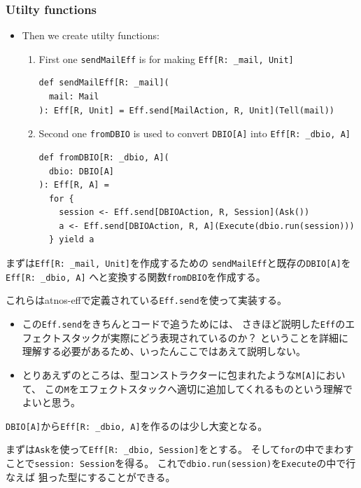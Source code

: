 \begin{frame}[fragile]
  \frametitle{Utilty functions}

  \begin{itemize}
    \item Then we create utilty functions:
    \begin{enumerate}
      \item First one \lstinline|sendMailEff| is
    for making \lstinline|Eff[R: _mail, Unit]|
\begin{lstlisting}[style=scala]
def sendMailEff[R: _mail](
  mail: Mail
): Eff[R, Unit] = Eff.send[MailAction, R, Unit](Tell(mail))
\end{lstlisting}

      \item Second one \lstinline|fromDBIO| is
      used to convert \lstinline|DBIO[A]| into \lstinline|Eff[R: _dbio, A]|

\begin{lstlisting}[style=scala]
def fromDBIO[R: _dbio, A](
  dbio: DBIO[A]
): Eff[R, A] =
  for {
    session <- Eff.send[DBIOAction, R, Session](Ask())
    a <- Eff.send[DBIOAction, R, A](Execute(dbio.run(session)))
  } yield a
\end{lstlisting}
    \end{enumerate}
  \end{itemize}

  \begin{notes}
    \item まずは\lstinline|Eff[R: _mail, Unit]|を作成するための
    \lstinline|sendMailEff|と既存の\lstinline|DBIO[A]|を\lstinline|Eff[R: _dbio, A]|
    へと変換する関数\lstinline|fromDBIO|を作成する。

    \item これらはatnos-effで定義されている\lstinline|Eff.send|を使って実装する。
    \begin{itemize}
      \item この\lstinline|Eff.send|をきちんとコードで追うためには、
      さきほど説明した\lstinline|Eff|のエフェクトスタックが実際にどう表現されているのか？
      ということを詳細に理解する必要があるため、いったんここではあえて説明しない。

      \item とりあえずのところは、型コンストラクターに包まれたような\lstinline|M[A]|において、
      この\lstinline|M|をエフェクトスタックへ適切に追加してくれるものという理解でよいと思う。
    \end{itemize}

    \item \lstinline|DBIO[A]|から\lstinline|Eff[R: _dbio, A]|を作るのは少し大変となる。

    
    \item まずは\lstinline|Ask|を使って\lstinline|Eff[R: _dbio, Session]|をとする。
    そして\lstinline|for|の中でまわすことで\lstinline|session: Session|を得る。
    これで\lstinline|dbio.run(session)|を\lstinline|Execute|の中で行なえば
    狙った型にすることができる。    
  \end{notes}
\end{frame}

